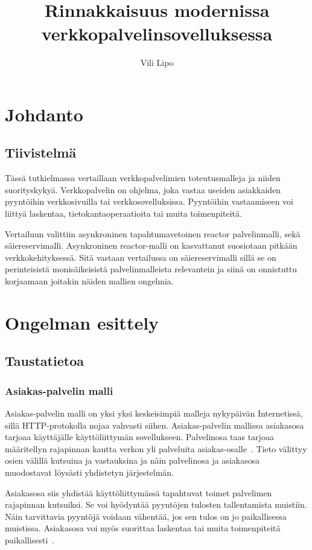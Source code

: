 \documentclass[12pt]{article}
\title{Rinnakkaisuus modernissa verkkopalvelinsovelluksessa}
\author{Vili Lipo}
\begin{document}
\maketitle
\newpage
\tableofcontents
\newpage
\section{Johdanto}
\subsection{Tiivistelmä}
Tässä tutkielmassa vertaillaan verkkopalvelimien toteutusmalleja
ja niiden suorityskykyä. Verkkopalvelin on ohjelma, joka vastaa useiden asiakkaiden pyyntöihin
verkkosivuilla tai verkkosovelluksissa. Pyyntöihin vastaamiseen
voi liittyä laskentaa, tietokantaoperaatioita tai muita toimenpiteitä.

Vertailuun valittiin asynkroninen tapahtumavetoinen reactor palvelinmalli, sekä säiereservimalli.
Asynkroninen reactor-malli on kasvattanut suosiotaan pitkään verkkokehityksessä.
Sitä vastaan vertailussa on säiereservimalli sillä se on perinteisistä
monisäikeisistä palvelinmalleista relevantein ja siinä on onnistuttu korjaamaan
joitakin näiden mallien ongelmia.
\section{Ongelman esittely}
\subsection{Taustatietoa}
\subsubsection{Asiakas-palvelin malli}
Asiakas-palvelin malli on yksi yksi keskeisimpiä malleja nykypäivän Internetissä,
sillä HTTP-protokolla nojaa vahvasti siihen. Asiakas-palvelin mallissa
asiakasosa tarjoaa käyttäjälle käyttöliittymän sovellukseen. Palvelinosa taas
tarjoaa määritellyn rajapinnan kautta verkon yli
palveluita asiakas-osalle~\cite{sinha_client-server_1992}.
Tieto välittyy osien välillä kutsuina ja vastauksina ja näin palvelinosa ja asiakasosa
muodostavat löysästi yhdistetyn järjestelmän.

Asiakasosa siis yhdistää käyttöliittymässä tapahtuvat toimet palvelimen
rajapinnan kutsuiksi. Se voi hyödyntää pyyntöjen tulosten tallentamista
muistiin. Näin tarvittavia pyyntöjä voidaan vähentää, jos sen tulos
on jo paikallisessa muistissa. Asiakasosa voi myös suorittaa
laskentaa tai muita toimenpiteitä paikallisesti~\cite{sinha_client-server_1992}.
\end{document}
